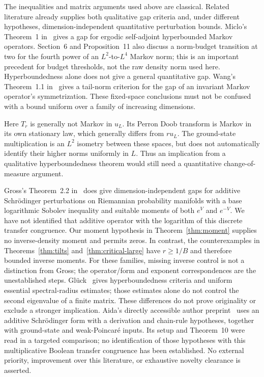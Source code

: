 \documentclass[11pt]{article}
\begin{document}
The inequalities and matrix arguments used above are classical. Related
literature already supplies both qualitative gap criteria and, under
different hypotheses, dimension-independent quantitative perturbation
bounds. Miclo's Theorem~1 in~\cite{Miclo} gives a gap for ergodic
self-adjoint hyperbounded Markov operators. Section~6 and
Proposition~11 also discuss a norm-budget transition at two for the
fourth power of an $L^2$-to-$L^4$ Markov norm; this is an important
precedent for budget thresholds, not the raw density norm used here.
Hyperboundedness alone does not give a general quantitative gap. Wang's Theorem~1.1 in~\cite{Wang} gives a tail-norm criterion
for the gap of an invariant Markov operator's symmetrization.
These fixed-space conclusions must not be confused with a bound uniform
over a family of increasing dimensions.

Here $T_r$ is generally not Markov in $u_L$. Its Perron Doob transform
is Markov in its own stationary law, which generally differs from $r u_L$.
The ground-state multiplication is an $L^2$ isometry between these spaces,
but does not automatically identify their higher norms uniformly in $L$.
Thus an implication from a qualitative hyperboundedness theorem would
still need a quantitative change-of-measure argument.

Gross's Theorem~2.2 in~\cite{Gross} does give dimension-independent gaps
for additive Schr\"odinger perturbations on Riemannian probability
manifolds with a base logarithmic Sobolev inequality and suitable moments
of both $e^V$ and $e^{-V}$. We have not identified that additive operator
with the logarithm of this discrete transfer congruence. Our moment
hypothesis in Theorem~\ref{thm:moment} supplies no inverse-density moment
and permits zeros. In contrast, the counterexamples in
Theorems~\ref{thm:tilts} and~\ref{thm:critical-large} have $r\ge1/B$ and therefore bounded inverse
moments. For these families, missing inverse control is not a distinction
from Gross; the operator/form and exponent correspondences are the
unestablished steps.
Gl\"uck~\cite{Gluck} gives hyperboundedness criteria and uniform essential
spectral-radius estimates; those estimates alone do not control the
second eigenvalue of a finite matrix. These differences do not prove
originality or exclude a stronger implication. Aida's directly accessible author preprint~\cite{Aida}
uses an additive Schr\"odinger form with a derivation and chain-rule
hypotheses, together with ground-state and weak-Poincar\'e inputs.
Its setup and Theorem~10 were read in a targeted comparison; no
identification of those hypotheses with this multiplicative Boolean
transfer congruence has been established. No external priority, improvement over this literature, or exhaustive
novelty clearance is asserted.
\end{document}
